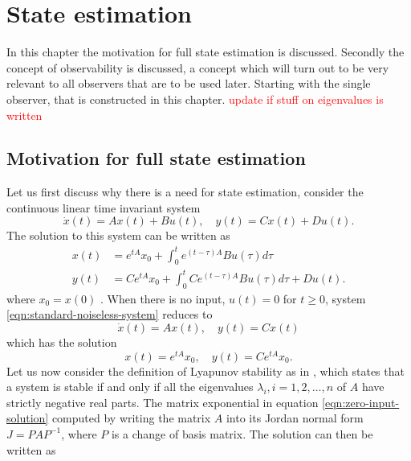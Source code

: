 \section{State estimation}\label{ch:state-estimation}
In this chapter the motivation for full state estimation is discussed. Secondly the concept of observability is discussed, a concept which will turn out to be very relevant to all observers that are to be used later. Starting with the single observer, that is constructed in this chapter. \textcolor{red}{update if stuff on eigenvalues is written}

\subsection{Motivation for full state estimation}
Let us first discuss why there is a need for state estimation, consider the continuous linear time invariant system
\begin{equation}\label{eqn:standard-noiseless-system}
    \dot{x}(t) = Ax(t) + Bu(t), \quad y(t) = Cx(t) + Du(t).
\end{equation}
The solution to this system can be written as
\begin{equation*}
    \begin{split}
        x(t) &= e^{tA}x_{0} + \int_{0}^{t}e^{(t-\tau)A}Bu(\tau)d\tau \\
        y(t) &= Ce^{tA}x_{0} + \int_{0}^{t}Ce^{(t-\tau)A}Bu(\tau)d\tau + Du(t).
    \end{split}
\end{equation*}
where $x_0 = x(0)$ \cite[Equation. 6.4]{Hespanha2018LinearTheory}. When there is no input, $u(t)=0$ for $t \geq 0$, system \eqref{eqn:standard-noiseless-system} reduces to
\begin{equation*}
    \dot{x}(t) = Ax(t), \quad y(t) = Cx(t)
\end{equation*}
which has the solution
\begin{equation}\label{eqn:zero-input-solution}
    x(t) = e^{tA}x_0, \quad y(t) = Ce^{tA}x_0.
\end{equation}
Let us now consider the definition of Lyapunov stability as in \cite[Th. 8.2]{Hespanha2018LinearTheory}, which states that a system is stable if and only if all the eigenvalues $\lambda_i,i=1,2,\dots,n$ of $A$ have strictly negative real parts. The matrix exponential in equation \eqref{eqn:zero-input-solution} computed by writing the matrix $A$ into its Jordan normal form $J=PAP^{-1}$, where $P$ is a change of basis matrix. The solution can then be written as 
